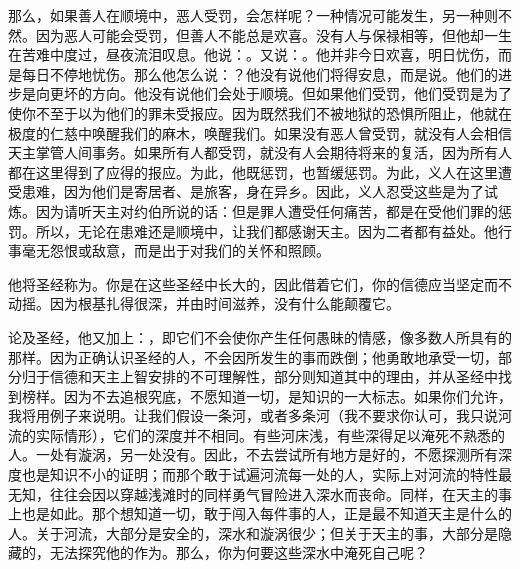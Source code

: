 那么，如果善人在顺境中，恶人受罚，会怎样呢？一种情况可能发生，另一种则不然。因为恶人可能会受罚，但善人不能总是欢喜。没有人与保禄相等，但他却一生在苦难中度过，昼夜流泪叹息。他说：。又说：。他并非今日欢喜，明日忧伤，而是每日不停地忧伤。那么他怎么说：？他没有说他们将得安息，而是说。他们的进步是向更坏的方向。他没有说他们会处于顺境。但如果他们受罚，他们受罚是为了使你不至于以为他们的罪未受报应。因为既然我们不被地狱的恐惧所阻止，他就在极度的仁慈中唤醒我们的麻木，唤醒我们。如果没有恶人曾受罚，就没有人会相信天主掌管人间事务。如果所有人都受罚，就没有人会期待将来的复活，因为所有人都在这里得到了应得的报应。为此，他既惩罚，也暂缓惩罚。为此，义人在这里遭受患难，因为他们是寄居者、是旅客，身在异乡。因此，义人忍受这些是为了试炼。因为请听天主对约伯所说的话：但是罪人遭受任何痛苦，都是在受他们罪的惩罚。所以，无论在患难还是顺境中，让我们都感谢天主。因为二者都有益处。他行事毫无怨恨或敌意，而是出于对我们的关怀和照顾。\par

他将圣经称为。你是在这些圣经中长大的，因此借着它们，你的信德应当坚定而不动摇。因为根基扎得很深，并由时间滋养，没有什么能颠覆它。\par

论及圣经，他又加上：，即它们不会使你产生任何愚昧的情感，像多数人所具有的那样。因为正确认识圣经的人，不会因所发生的事而跌倒；他勇敢地承受一切，部分归于信德和天主上智安排的不可理解性，部分则知道其中的理由，并从圣经中找到榜样。因为不去追根究底，不愿知道一切，是知识的一大标志。如果你们允许，我将用例子来说明。让我们假设一条河，或者多条河（我不要求你认可，我只说河流的实际情形），它们的深度并不相同。有些河床浅，有些深得足以淹死不熟悉的人。一处有漩涡，另一处没有。因此，不去尝试所有地方是好的，不愿探测所有深度也是知识不小的证明；而那个敢于试遍河流每一处的人，实际上对河流的特性最无知，往往会因以穿越浅滩时的同样勇气冒险进入深水而丧命。同样，在天主的事上也是如此。那个想知道一切，敢于闯入每件事的人，正是最不知道天主是什么的人。关于河流，大部分是安全的，深水和漩涡很少；但关于天主的事，大部分是隐藏的，无法探究他的作为。那么，你为何要这些深水中淹死自己呢？\par

